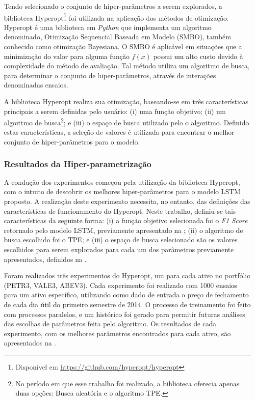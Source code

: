 Tendo selecionado o conjunto de hiper-parâmetros a serem explorados, a biblioteca Hyperopt\footnote{Disponível em \url{https://github.com/hyperopt/hyperopt}} foi utilizada na aplicação dos métodos de otimização. Hyperopt é uma biblioteca em \textit{Python} que implementa um algoritmo denominado, Otimização Sequencial Baseada em Modelo (SMBO), também conhecido como otimização Bayesiana. O SMBO é aplicável em situações que a minimização do valor para alguma função $f(x)$ possui um alto custo devido à complexidade do método de avaliação. Tal método utiliza um algoritmo de busca, para determinar o conjunto de hiper-parâmetros, através de interações denominadas ensaios. 

A biblioteca Hyperopt realiza sua otimização, baseando-se em três características principais a serem definidas pelo usuário: (i) uma função objetivo; (ii) um algoritmo de busca\footnote{No período em que esse trabalho foi realizado, a biblioteca oferecia apenas duas opções: Busca aleatória e o algoritmo \acrfull{TPE}.}; e (iii) o espaço de busca utilizado pelo o algoritmo. Definido estas características, a seleção de valores é utilizada para encontrar o melhor conjunto de hiper-parâmetros para o modelo.

\subsubsection{Resultados da Hiper-parametrização}

A condução dos experimentos começou pela utilização da biblioteca Hyperopt, com o intuito de descobrir os melhores hiper-parâmetros para o modelo \acrshort{LSTM} proposto. A realização deste experimento necessita, no entanto, das definições das características de funcionamento do Hyperopt. Neste trabalho, definiu-se tais características da seguinte forma: (i) a função objetivo selecionada foi o \textit{F1 Score} retornado pelo modelo \acrshort{LSTM}, previamente apresentado na ; (ii) o algoritmo de busca escolhido foi o \acrshort{TPE}; e (iii) o espaço de busca selecionado são os valores escolhidos para serem explorados para cada um dos parâmetros previamente apresentados, definidos na . 



Foram realizados três experimentos do Hyperopt, um para cada ativo no portfólio (PETR3, VALE3, ABEV3). Cada experimento foi realizado com 1000 ensaios para um ativo específico, utilizando como dado de entrada o preço de fechamento de cada dia útil do primeiro semestre de 2014. O processo de treinamento foi feito com processos paralelos, e um histórico foi gerado para permitir futuras análises das escolhas de parâmetros feita pelo algoritmo. Os resultados de cada experimento, com os melhores parâmetros encontrados para cada ativo, são apresentados na .

